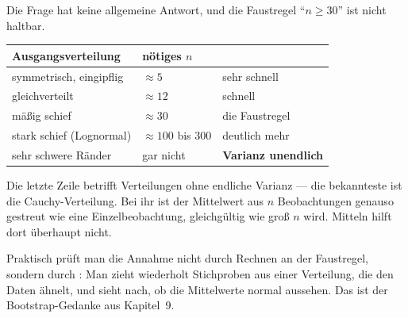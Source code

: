 \begin{forschung}
Die Frage hat keine allgemeine Antwort, und die Faustregel \enquote{$n \ge 30$} ist nicht haltbar.

\begin{center}
{\small
\renewcommand{\arraystretch}{1.45}
\begin{tabular}{@{}P{3.2cm}P{2.2cm}P{2.8cm}@{}}
\toprule
\textbf{Ausgangs\-verteilung} & \textbf{nötiges $n$} & \\
\midrule
symmetrisch, eingipflig & $\approx 5$ & \textcolor{gruen}{sehr schnell}\\
gleichverteilt & $\approx 12$ & \textcolor{gruen}{schnell}\\
mäßig schief & $\approx 30$ & die Faustregel\\
stark schief (Lognormal) & $\approx 100$ bis $300$ & \textcolor{akzent}{deutlich mehr}\\
sehr schwere Ränder & \textcolor{akzent}{gar nicht} & \textcolor{akzent}{\textbf{Varianz unendlich}}\\
\bottomrule
\end{tabular}}
\end{center}

Die letzte Zeile betrifft Verteilungen ohne endliche Varianz --- die bekannteste ist die Cauchy-Verteilung. Bei ihr ist der Mittelwert aus $n$ Beobachtungen genauso gestreut wie eine Einzelbeobachtung, gleichgültig wie groß $n$ wird. Mitteln hilft dort überhaupt nicht.

\begin{center}
\begin{minipage}{0.88\textwidth}
\end{minipage}
\end{center}

Praktisch prüft man die Annahme nicht durch Rechnen an der Faustregel, sondern durch : Man zieht wiederholt Stichproben aus einer Verteilung, die den Daten ähnelt, und sieht nach, ob die Mittelwerte normal aussehen. Das ist der Bootstrap-Gedanke aus Kapitel~9.
\end{forschung}

